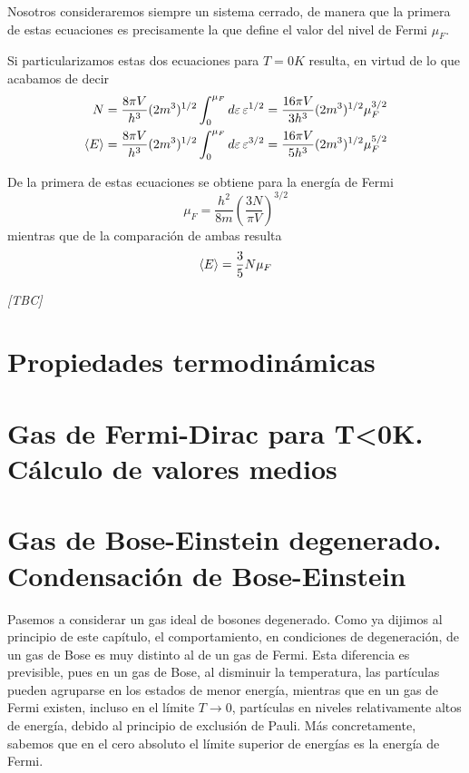 Nosotros consideraremos siempre un sistema cerrado, de manera que la primera de estas ecuaciones es precisamente la que define el valor del nivel de Fermi $\mu_F$.

Si particularizamos estas dos ecuaciones para $T = 0 K$ resulta, en virtud de lo que acabamos de decir
\begin{align}
	N &=  \frac{8\pi V}{h^3} (2m^3)^{1/2} \int_{0}^{\mu_F} \dd{\varepsilon} \varepsilon^{1/2} = \frac{16\pi V}{3h^3} (2m^3)^{1/2} \mu_F^{3/2}\\
	\expval{E} &=  \frac{8\pi V}{h^3} (2m^3)^{1/2} \int_{0}^{\mu_F} \dd{\varepsilon} \varepsilon^{3/2} = \frac{16\pi V}{5h^3} (2m^3)^{1/2} \mu_F^{5/2}
\end{align}

De la primera de estas ecuaciones se obtiene para la energía de Fermi
\begin{equation}
	\mu_F = \frac{h^2}{8m} \left( \frac{3N}{\pi V}\right)^{3/2}
\end{equation}
mientras que de la comparación de ambas resulta
\begin{equation}
	\expval{E} = \frac{3}{5} N \mu_F
\end{equation}

\textit{[TBC]}

\section{Propiedades termodinámicas}

\section{Gas de Fermi-Dirac para T<0K. Cálculo de valores medios}

\section{Gas de Bose-Einstein degenerado. Condensación de Bose-Einstein}

Pasemos a considerar un gas ideal de bosones degenerado.
Como ya dijimos al principio de este capítulo, el comportamiento, en condiciones de degeneración, de un gas de Bose es muy distinto al de un gas de Fermi.
Esta diferencia es previsible, pues en un gas de Bose, al disminuir la temperatura, las partículas pueden agruparse en los estados de menor energía, mientras que en un gas de Fermi existen, incluso en el límite $T \rightarrow 0$, partículas en niveles relativamente altos de energía, debido al principio de exclusión de Pauli.
Más concretamente, sabemos que en el cero absoluto el límite superior de energías es la energía de Fermi.

